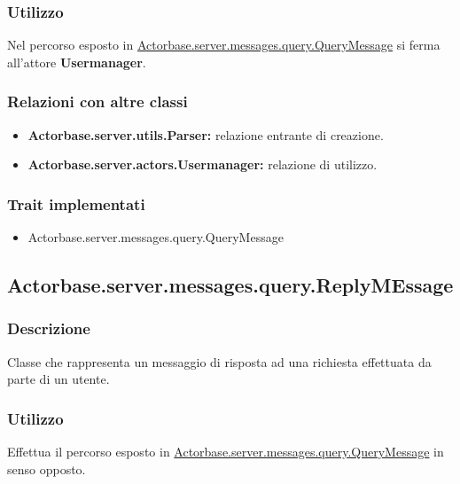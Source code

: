 \documentclass[a4paper]{article}
\begin{document}
			\subsubsection{Utilizzo}
				Nel percorso esposto in \hyperref[QueryMessage]{Actorbase.server.messages.query.QueryMessage} si ferma all'attore \textbf{Usermanager}.
				
			\subsubsection{Relazioni con altre classi}
				\begin{itemize}
					\item \textbf{Actorbase.server.utils.Parser:} relazione entrante di creazione.
					\item \textbf{Actorbase.server.actors.Usermanager:} relazione di utilizzo.
				\end{itemize}
			\subsubsection{Trait implementati}
				\begin{itemize}
					\item Actorbase.server.messages.query.QueryMessage
				\end{itemize}
		
		\subsection{Actorbase.server.messages.query.ReplyMEssage}
			\subsubsection{Descrizione}
				Classe che rappresenta un messaggio di risposta ad una richiesta effettuata da parte di un utente.
				
			\subsubsection{Utilizzo}
				Effettua il percorso esposto in \hyperref[QueryMessage]{Actorbase.server.messages.query.QueryMessage} in senso opposto.
				
\end{document}
